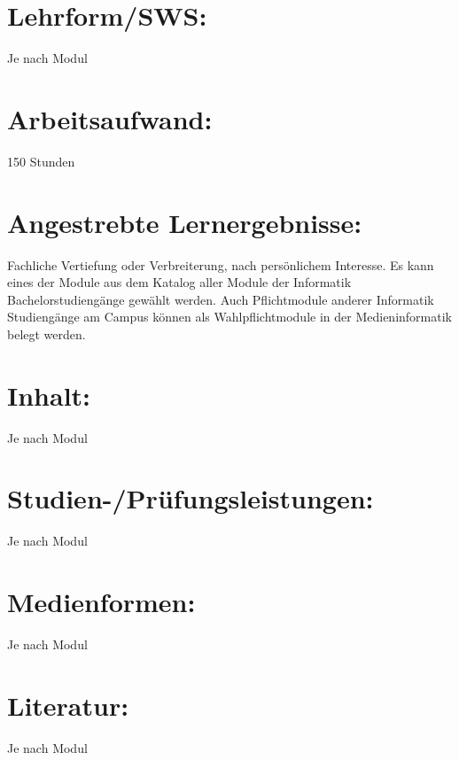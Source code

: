 \section*{Lehrform/SWS:}\label{lehrformsws-28}

Je nach Modul

\section*{Arbeitsaufwand:}\label{arbeitsaufwand-27}

150 Stunden

\section*{Angestrebte
Lernergebnisse:}\label{angestrebte-lernergebnisse-28}

Fachliche Vertiefung oder Verbreiterung, nach persönlichem Interesse. Es
kann eines der Module aus dem Katalog aller Module der Informatik
Bachelorstudiengänge gewählt werden. Auch Pflichtmodule anderer
Informatik Studiengänge am Campus können als Wahlpflichtmodule in der
Medieninformatik belegt werden.

\section*{Inhalt:}\label{inhalt-28}

Je nach Modul

\section*{Studien-/Prüfungsleistungen:}\label{studien-pruxfcfungsleistungen-26}

Je nach Modul

\section*{Medienformen:}\label{medienformen-19}

Je nach Modul

\section*{Literatur:}\label{literatur-24}

Je nach Modul
